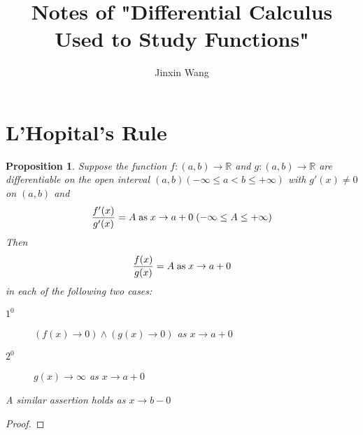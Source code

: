 \documentclass[onecolumn]{ctexart}
\title{Notes of "Differential Calculus Used to Study Functions"}
\author{Jinxin Wang}
\date{}
\newtheorem{proposition}{Proposition}
\begin{document}
\maketitle

\section{L'Hopital's Rule}

\begin{proposition}
  Suppose the function $f: (a,b) \to \mathbb{R}$ and $g: (a,b) \to \mathbb{R}$
  are differentiable on the open interval $(a, b)(-\infty \leq a < b \leq 
  +\infty)$ with $g'(x) \neq 0$ on $(a, b)$ and
  \[
    \frac{f'(x)}{g'(x)} = A \thickspace \textnormal{as} \thickspace x \to a+0 \thickspace (-\infty \leq A \leq +\infty)
  \]
  Then
  \[
    \frac{f(x)}{g(x)} = A \thickspace \textnormal{as} \thickspace x \to a+0   
  \]
  in each of the following two cases:
  \begin{description}
    \item[$1^0$] $(f(x) \to 0) \wedge (g(x) \to 0)$ as $x \to a+0$
    \item[$2^0$] $g(x) \to \infty$ as $x \to a+0$
  \end{description}

  A similar assertion holds as $x \to b-0$
\end{proposition}
\begin{proof}
  
\end{proof}
\end{document}
